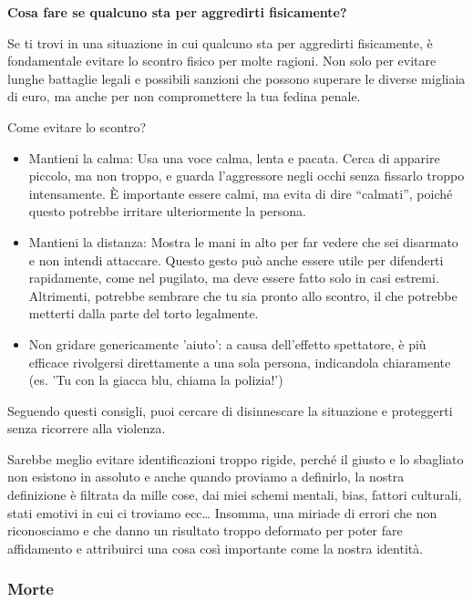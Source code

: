 \documentclass[12pt]{book} %
\begin{document}
\begin{mdframed}[linewidth=1pt]
\textbf{Cosa fare se qualcuno sta per aggredirti fisicamente?}

Se ti trovi in una situazione in cui qualcuno sta per aggredirti fisicamente, è fondamentale evitare lo scontro fisico per molte ragioni. Non solo per evitare lunghe battaglie legali e possibili sanzioni che possono superare le diverse migliaia di euro, ma anche per non compromettere la tua fedina penale.

Come evitare lo scontro?
\begin{itemize}
\item Mantieni la calma: Usa una voce calma, lenta e pacata. Cerca di apparire piccolo, ma non troppo, e guarda l’aggressore negli occhi senza fissarlo troppo intensamente. È importante essere calmi, ma evita di dire “calmati”, poiché questo potrebbe irritare ulteriormente la persona.
\item Mantieni la distanza: Mostra le mani in alto per far vedere che sei disarmato e non intendi attaccare. Questo gesto può anche essere utile per difenderti rapidamente, come nel pugilato, ma deve essere fatto solo in casi estremi. Altrimenti, potrebbe sembrare che tu sia pronto allo scontro, il che potrebbe metterti dalla parte del torto legalmente.
\item Non gridare genericamente 'aiuto': a causa dell'effetto spettatore, è più efficace rivolgersi direttamente a una sola persona, indicandola chiaramente (es. 'Tu con la giacca blu, chiama la polizia!')
\end{itemize}
Seguendo questi consigli, puoi cercare di disinnescare la situazione e proteggerti senza ricorrere alla violenza.
\end{mdframed}

Sarebbe meglio evitare identificazioni troppo rigide, perché il giusto e lo sbagliato non esistono in assoluto e anche quando
proviamo a definirlo, la nostra definizione è filtrata da mille cose, dai miei schemi mentali,
bias, fattori culturali, stati emotivi in cui ci troviamo ecc… Insomma, una miriade di errori che non riconosciamo e che
danno un risultato troppo deformato per poter fare affidamento e attribuirci una cosa così importante come la nostra identità.

\subsubsection{Morte}
\end{document}
